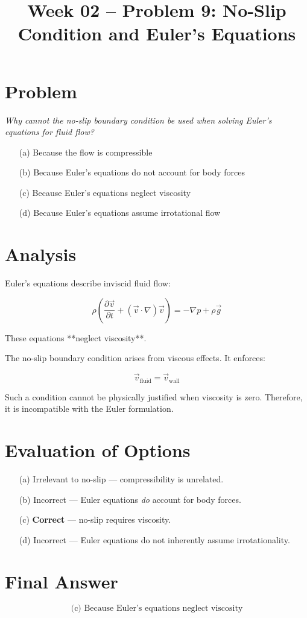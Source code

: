 \documentclass[12pt]{article}
\title{Week 02 -- Problem 9: No-Slip Condition and Euler's Equations}
\date{}
\begin{document}
\maketitle

\section*{Problem}

\textit{Why cannot the no-slip boundary condition be used when solving Euler’s equations for fluid flow?}

\begin{itemize}
\item[(a)] Because the flow is compressible
\item[(b)] Because Euler’s equations do not account for body forces
\item[(c)] Because Euler’s equations neglect viscosity
\item[(d)] Because Euler’s equations assume irrotational flow
\end{itemize}

\section*{Analysis}

Euler’s equations describe inviscid fluid flow:

\[
\rho \left( \frac{\partial \vec{v}}{\partial t} + (\vec{v} \cdot \nabla)\vec{v} \right) = -\nabla p + \rho \vec{g}
\]

These equations **neglect viscosity**.

The no-slip boundary condition arises from viscous effects. It enforces:

\[
\vec{v}_{\text{fluid}} = \vec{v}_{\text{wall}}
\]

Such a condition cannot be physically justified when viscosity is zero. Therefore, it is incompatible with the Euler formulation.

\section*{Evaluation of Options}

\begin{itemize}
\item[(a)] Irrelevant to no-slip — compressibility is unrelated.
\item[(b)] Incorrect — Euler equations \textit{do} account for body forces.
\item[(c)] \textbf{Correct} — no-slip requires viscosity.
\item[(d)] Incorrect — Euler equations do not inherently assume irrotationality.
\end{itemize}

\section*{Final Answer}

\[
\boxed{\text{(c) Because Euler’s equations neglect viscosity}}
\]
\end{document}
